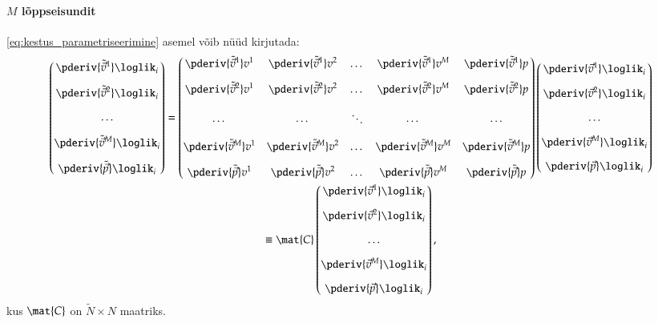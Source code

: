 \documentclass[a4paper]{article}
\numberwithin{equation}{subsection}
\begin{document}
\paragraph{$M$ lõppseisundit}

\eqref{eq:kestus_parametriseerimine} asemel võib nüüd kirjutada:
\begin{multline}
  \begin{pmatrix}
    \displaystyle\pderiv{\tilde{\vec{v}}^1}\loglik_i\\[2ex]
    \displaystyle\pderiv{\tilde{\vec{v}}^2}\loglik_i\\[2ex]
    \dots\\[2ex]
    \displaystyle\pderiv{\tilde{\vec{v}}^M}\loglik_i\\[2ex]
    \displaystyle\pderiv{\tilde{\vec{p}}}\loglik_i
  \end{pmatrix}
  =
  \begin{pmatrix}
    \displaystyle\pderiv{\tilde{\vec{v}}^1} v^1 &
    \displaystyle\pderiv{\tilde{\vec{v}}^1} v^2 &
    \dots &
    \displaystyle\pderiv{\tilde{\vec{v}}^1} v^M &
    \displaystyle\pderiv{\tilde{\vec{v}}^1}p\\[2ex]
    \displaystyle\pderiv{\tilde{\vec{v}}^2} v^1 &
    \displaystyle\pderiv{\tilde{\vec{v}}^2} v^2 &
    \dots &
    \displaystyle\pderiv{\tilde{\vec{v}}^2} v^M &
    \displaystyle\pderiv{\tilde{\vec{v}}^2}p\\[2ex]
    \cdots &
    \cdots &
    \ddots &
    \cdots &
    \cdots\\[2ex]
    \displaystyle\pderiv{\tilde{\vec{v}}^M} v^1 &
    \displaystyle\pderiv{\tilde{\vec{v}}^M} v^2 &
    \dots &
    \displaystyle\pderiv{\tilde{\vec{v}}^M} v^M &
    \displaystyle\pderiv{\tilde{\vec{v}}^M}p\\[2ex]
    \displaystyle\pderiv{\tilde{\vec{p}}} v^1 &
    \displaystyle\pderiv{\tilde{\vec{p}}} v^2 &
    \dots &
    \displaystyle\pderiv{\tilde{\vec{p}}} v^M &
    \displaystyle\pderiv{\tilde{\vec{p}}} p
  \end{pmatrix}
  \begin{pmatrix}
    \displaystyle\pderiv{\vec{v}^1}\loglik_i\\[2ex]
    \displaystyle\pderiv{\vec{v}^2}\loglik_i\\[2ex]
    \dots\\[2ex]
    \displaystyle\pderiv{\vec{v}^M}\loglik_i\\[2ex]
    \displaystyle\pderiv{\vec{p}}\loglik_i
  \end{pmatrix}
  \\
  \equiv
  \mat{C}
  \begin{pmatrix}
    \displaystyle\pderiv{\vec{v}^1}\loglik_i\\[2ex]
    \displaystyle\pderiv{\vec{v}^2}\loglik_i\\[2ex]
    \dots\\[2ex]
    \displaystyle\pderiv{\vec{v}^M}\loglik_i\\[2ex]
    \displaystyle\pderiv{\vec{p}}\loglik_i
  \end{pmatrix},
\end{multline}
kus $\mat{C}$ on $\tilde N \times N$ maatriks.
\end{document}
